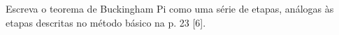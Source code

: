 Escreva o teorema de Buckingham Pi como uma série de etapas, análogas às etapas descritas no método básico na p. 23 [6].
